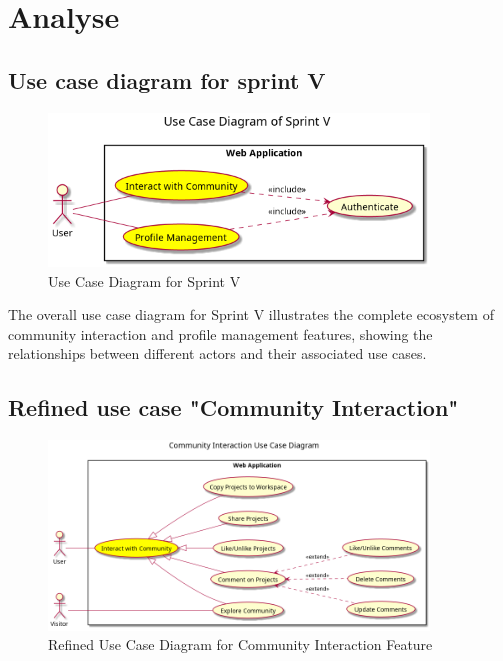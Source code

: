 \section{Analyse}

\subsection{Use case diagram for sprint V}

\begin{figure}[H]
\centering
\includegraphics[width=0.9\textwidth]{conception/SprintV/use_case_diagrams/use_case_diagram_of_SprintV.png}
\caption{Use Case Diagram for Sprint V}
\label{fig:use_case_sprint_v}
\end{figure}

The overall use case diagram for Sprint V illustrates the complete ecosystem of community interaction and profile management features, showing the relationships between different actors and their associated use cases.

\subsection{Refined use case "Community Interaction"}

\begin{figure}[H]
\centering
\includegraphics[width=0.9\textwidth]{conception/SprintV/use_case_diagrams/refined_use_case_feature_community_interaction.png}
\caption{Refined Use Case Diagram for Community Interaction Feature}
\label{fig:community_interaction_use_case}
\end{figure}

